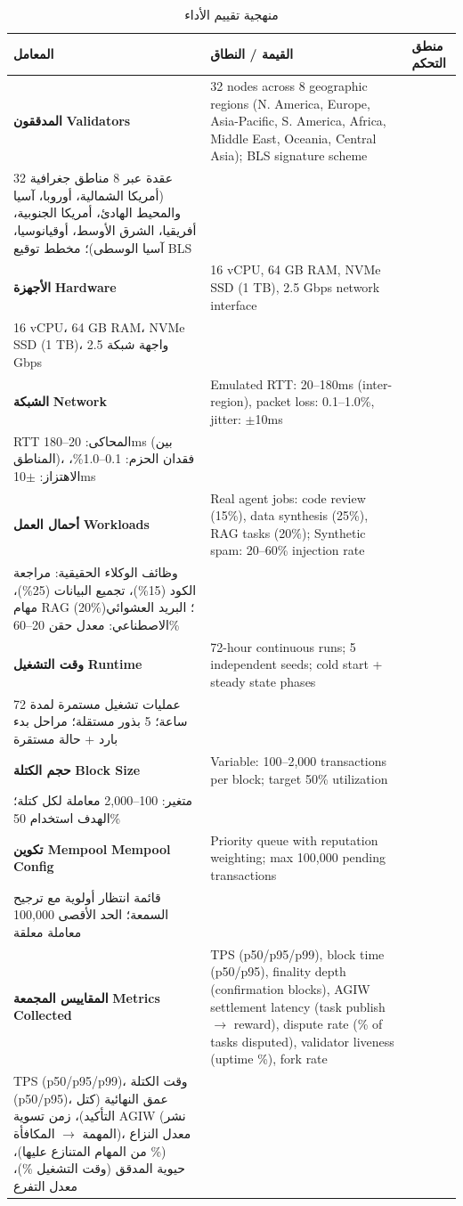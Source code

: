 \documentclass[11pt]{article}
\begin{document}
\begin{table}[H]
\centering
\caption{منهجية تقييم الأداء}
\label{tab:evaluation-methodology}
\begin{tabular}{@{}p{}p{}@{}}
\toprule
\textbf{المعامل} & \textbf{القيمة / النطاق} & \textbf{منطق التحكم} \\ \midrule
\textbf{المدققون} \textbf{Validators} & 32 nodes across 8 geographic regions (N. America, Europe, Asia-Pacific, S. America, Africa, Middle East, Oceania, Central Asia); BLS signature scheme \\ 32 عقدة عبر 8 مناطق جغرافية (أمريكا الشمالية، أوروبا، آسيا والمحيط الهادئ، أمريكا الجنوبية، أفريقيا، الشرق الأوسط، أوقيانوسيا، آسيا الوسطى)؛ مخطط توقيع BLS \\
\textbf{الأجهزة} \textbf{Hardware} & 16 vCPU, 64 GB RAM, NVMe SSD (1 TB), 2.5 Gbps network interface \\ 16 vCPU، 64 GB RAM، NVMe SSD (1 TB)، واجهة شبكة 2.5 Gbps \\
\textbf{الشبكة} \textbf{Network} & Emulated RTT: 20--180ms (inter-region), packet loss: 0.1--1.0\%, jitter: $\pm$10ms \\ RTT المحاكى: 20--180ms (بين المناطق)، فقدان الحزم: 0.1--1.0\%، الاهتزاز: $\pm$10ms \\
\textbf{أحمال العمل} \textbf{Workloads} & Real agent jobs: code review (15\%), data synthesis (25\%), RAG tasks (20\%); Synthetic spam: 20--60\% injection rate \\ وظائف الوكلاء الحقيقية: مراجعة الكود (15\%)، تجميع البيانات (25\%)، مهام RAG (20\%)؛ البريد العشوائي الاصطناعي: معدل حقن 20--60\% \\
\textbf{وقت التشغيل} \textbf{Runtime} & 72-hour continuous runs; 5 independent seeds; cold start + steady state phases \\ عمليات تشغيل مستمرة لمدة 72 ساعة؛ 5 بذور مستقلة؛ مراحل بدء بارد + حالة مستقرة \\
\textbf{حجم الكتلة} \textbf{Block Size} & Variable: 100--2,000 transactions per block; target 50\% utilization \\ متغير: 100--2,000 معاملة لكل كتلة؛ الهدف استخدام 50\% \\
\textbf{تكوين Mempool} \textbf{Mempool Config} & Priority queue with reputation weighting; max 100,000 pending transactions \\ قائمة انتظار أولوية مع ترجيح السمعة؛ الحد الأقصى 100,000 معاملة معلقة \\
\textbf{المقاييس المجمعة} \textbf{Metrics Collected} & TPS (p50/p95/p99), block time (p50/p95), finality depth (confirmation blocks), AGIW settlement latency (task publish $\rightarrow$ reward), dispute rate (\% of tasks disputed), validator liveness (uptime \%), fork rate \\ TPS (p50/p95/p99)، وقت الكتلة (p50/p95)، عمق النهائية (كتل التأكيد)، زمن تسوية AGIW (نشر المهمة $\rightarrow$ المكافأة)، معدل النزاع (\% من المهام المتنازع عليها)، حيوية المدقق (وقت التشغيل \%)، معدل التفرع \\

\end{tabular}
\end{table}
\end{document}
